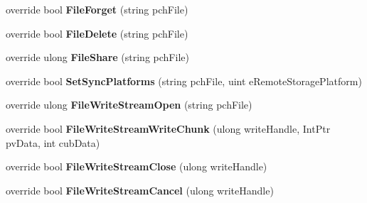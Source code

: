 \begin{DoxyCompactItemize}
\item 
\mbox{\label{class_valve_1_1_steamworks_1_1_c_steam_remote_storage_a3c96340acd28a4e2e4067107cf7dab0f}} 
override bool {\bfseries File\+Forget} (string pch\+File)
\item 
\mbox{\label{class_valve_1_1_steamworks_1_1_c_steam_remote_storage_af0bba429ef6af586e2ce3f60b5fef85c}} 
override bool {\bfseries File\+Delete} (string pch\+File)
\item 
\mbox{\label{class_valve_1_1_steamworks_1_1_c_steam_remote_storage_ad3e0aa4ed42a2c12795f9da0872be364}} 
override ulong {\bfseries File\+Share} (string pch\+File)
\item 
\mbox{\label{class_valve_1_1_steamworks_1_1_c_steam_remote_storage_a97affa6ebfad8b2bc6d52d0df578c53f}} 
override bool {\bfseries Set\+Sync\+Platforms} (string pch\+File, uint e\+Remote\+Storage\+Platform)
\item 
\mbox{\label{class_valve_1_1_steamworks_1_1_c_steam_remote_storage_a75b00758156d55a01875e8805d243637}} 
override ulong {\bfseries File\+Write\+Stream\+Open} (string pch\+File)
\item 
\mbox{\label{class_valve_1_1_steamworks_1_1_c_steam_remote_storage_a7bc19f07ae3ecf38494c440f915a7695}} 
override bool {\bfseries File\+Write\+Stream\+Write\+Chunk} (ulong write\+Handle, Int\+Ptr pv\+Data, int cub\+Data)
\item 
\mbox{\label{class_valve_1_1_steamworks_1_1_c_steam_remote_storage_abb6b8686b0784d7652d5af4a8605b2ea}} 
override bool {\bfseries File\+Write\+Stream\+Close} (ulong write\+Handle)
\item 
\mbox{\label{class_valve_1_1_steamworks_1_1_c_steam_remote_storage_a11d7bc487c8ef3ee3a8a6e4dfc669090}} 
override bool {\bfseries File\+Write\+Stream\+Cancel} (ulong write\+Handle)

\end{DoxyCompactItemize}
